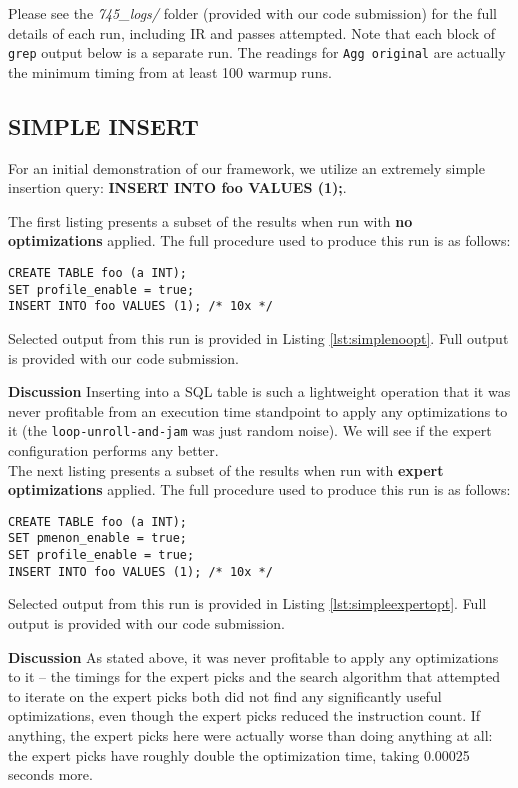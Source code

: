 \documentclass{vldb}
\newcommand{\dbCode}[1]{{\sffamily\small \textbf{#1}}\xspace}
\begin{document}
Please see the \textit{745\_logs/} folder (provided with our code submission) for the full details of each run, including IR and passes attempted. Note that each block of \lstinline{grep} output below is a separate run. The readings for \lstinline{Agg original} are actually the minimum timing from at least 100 warmup runs.

\subsection{SIMPLE INSERT}

For an initial demonstration of our framework, we utilize an extremely simple insertion query: \dbCode{INSERT INTO foo VALUES (1);}.

The first listing presents a subset of the results when run with \textbf{no optimizations} applied. The full procedure used to produce this run is as follows:
\begin{lstlisting}
CREATE TABLE foo (a INT);
SET profile_enable = true;
INSERT INTO foo VALUES (1); /* 10x */
\end{lstlisting}

Selected output from this run is provided in Listing \ref{lst:simplenoopt}. Full output is provided with our code submission.

\textbf{Discussion} Inserting into a SQL table is such a lightweight operation that it was never profitable from an execution time standpoint to apply any optimizations to it (the \lstinline{loop-unroll-and-jam} was just random noise). We will see if the expert configuration performs any better. \\

The next listing presents a subset of the results when run with \textbf{expert optimizations} applied. The full procedure used to produce this run is as follows:
\begin{lstlisting}
CREATE TABLE foo (a INT);
SET pmenon_enable = true;
SET profile_enable = true;
INSERT INTO foo VALUES (1); /* 10x */
\end{lstlisting}

Selected output from this run is provided in Listing \ref{lst:simpleexpertopt}. Full output is provided with our code submission.

\textbf{Discussion} As stated above, it was never profitable to apply any optimizations to it -- the timings for the expert picks and the search algorithm that attempted to iterate on the expert picks both did not find any significantly useful optimizations, even though the expert picks reduced the instruction count. If anything, the expert picks here were actually worse than doing anything at all: the expert picks have roughly double the optimization time, taking 0.00025 seconds more.
\end{document}
